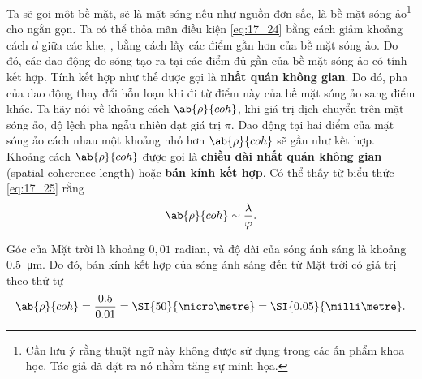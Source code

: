 Ta sẽ gọi một bề mặt, sẽ là mặt sóng nếu như nguồn đơn sắc, là bề mặt sóng ảo\footnote{Cần lưu ý rằng thuật ngữ này không được sử dụng trong các ấn phẩm khoa học. Tác giả đã đặt ra nó nhằm tăng sự minh họa.} cho ngắn gọn.
Ta có thể thỏa mãn điều kiện \eqref{eq:17_24} bằng cách giảm khoảng cách $d$ giữa các khe, \ie, bằng cách lấy các điểm gần hơn của bề mặt sóng ảo.
Do đó, các dao động do sóng tạo ra tại các điểm đủ gần của bề mặt sóng ảo có tính kết hợp.
Tính kết hợp như thế được gọi là \textbf{nhất quán không gian}.
Do đó, pha của dao động thay đổi hỗn loạn khi đi từ điểm này của bề mặt sóng ảo sang điểm khác.
Ta hãy nói về khoảng cách $\ab{\rho}{coh}$, khi giá trị dịch chuyển trên mặt sóng ảo, độ lệch pha ngẫu nhiên đạt giá trị $\pi$.
Dao động tại hai điểm của mặt sóng ảo cách nhau một khoảng nhỏ hơn $\ab{\rho}{coh}$ sẽ gần như kết hợp.
Khoảng cách $\ab{\rho}{coh}$ được gọi là \textbf{chiều dài nhất quán không gian} (spatial coherence length) hoặc \textbf{bán kính kết hợp}.
Có thể thấy từ biểu thức \eqref{eq:17_25} rằng
\begin{equation}\label{eq:17_26}
    \ab{\rho}{coh} \sim \frac{\lambda}{\varphi}.
\end{equation}

Góc của Mặt trời là khoảng $0,01$ radian, và độ dài của sóng ánh sáng là khoảng \SI{0,5}{\micro\metre}.
Do đó, bán kính kết hợp của sóng ánh sáng đến từ Mặt trời có giá trị theo thứ tự
\begin{equation}\label{eq:17_27}
    \ab{\rho}{coh} = \frac{0.5}{0.01} = \SI{50}{\micro\metre} = \SI{0.05}{\milli\metre}.
\end{equation}

